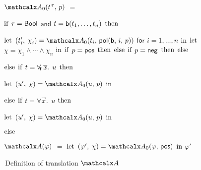 \begin{figure}[t]
\normalsize
\begin{enumerate}
\itemx[\ ]
$\conv_0( t\typ{\tau},\, p )$ $=$
 \begin{itemize}
   \itemx[] $\textrm{if}$ $\tau = \mathsf{Bool}$ $\mathsf{and}$ $t = \mathsf{b}(t_1,\dotsc,t_n)$ $\textrm{then}$
    \begin{itemize}
      \itemx[] $\textrm{let}$ $( t'_i,\, \chi_i ) = \conv_0( t_i,\, \pol( \boolop,\, i,\, p ) )$ $\mathsf{for}$ $i = 1, \dotsc, n$ $\textrm{in}$%
      \itemx[] $\textrm{let}$ $\chi = \chi_1 \wedge \cdots \wedge \chi_n$ $\textrm{in}$
      \itemx[] $\textrm{if}$ $p = \mathsf{pos}$ $\textrm{then}$ 
      \itemx[] $\textrm{else}$ $\textrm{if}$ $p = \mathsf{neg}$ $\textrm{then}$ 
      \itemx[] $\textrm{else}$ 
    \end{itemize}
  \itemx[] $\textrm{else}$ $\textrm{if}$ $t = \forall_{\!\mathsf{f}\:} \overline{x}.\;\, u$ $\textrm{then}$
    \begin{itemize}
      \itemx[] $\textrm{let}$ $( u',\, \chi ) = \conv_0( u,\, p )$ $\textrm{in}$ 
    \end{itemize}
  \itemx[] $\textrm{else}$ $\textrm{if}$ $t = \forall \vec x.\;\, u$ $\textrm{then}$
    \begin{itemize}
      \itemx[] $\textrm{let}$ $( u',\, \chi ) = \conv_0( u,\, p )$ $\textrm{in}$ 
    \end{itemize}
   \itemx[] $\textrm{else}$
   \begin{itemize}
     \itemx[] \return {}
   \end{itemize}
 \end{itemize}
\end{enumerate}
\begin{enumerate}
\itemx[\ ]
$\conv( \varphi )$ $=$ $\textrm{let}$ $( \varphi',\, \chi ) = \conv_0( \varphi,\, \ppos )$ $\textrm{in}$ $\varphi'$
\\[-1.5\baselineskip] %
\end{enumerate}
\caption{\,Definition of translation $\conv$}
\label{fig:A}
\end{figure}

